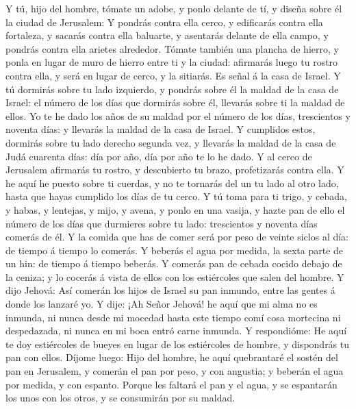  Y tú, hijo del hombre, tómate un adobe, y ponlo delante de
tí, y diseña sobre él la ciudad de Jerusalem:  Y pondrás
contra ella cerco, y edificarás contra ella fortaleza, y sacarás contra
ella baluarte, y asentarás delante de ella campo, y pondrás contra ella
arietes alrededor.  Tómate también una plancha de hierro, y
ponla en lugar de muro de hierro entre ti y la ciudad: afirmarás luego
tu rostro contra ella, y será en lugar de cerco, y la sitiarás. Es señal
á la casa de Israel.  Y tú dormirás sobre tu lado izquierdo,
y pondrás sobre él la maldad de la casa de Israel: el número de los días
que dormirás sobre él, llevarás sobre ti la maldad de ellos.
 Yo te he dado los años de su maldad por el número de los
días, trescientos y noventa días: y llevarás la maldad de la casa de
Israel.  Y cumplidos estos, dormirás sobre tu lado derecho
segunda vez, y llevarás la maldad de la casa de Judá cuarenta días: día
por año, día por año te lo he dado.  Y al cerco de Jerusalem
afirmarás tu rostro, y descubierto tu brazo, profetizarás contra ella.
 Y he aquí he puesto sobre ti cuerdas, y no te tornarás del
un tu lado al otro lado, hasta que hayas cumplido los días de tu cerco.
 Y tú toma para ti trigo, y cebada, y habas, y lentejas, y
mijo, y avena, y ponlo en una vasija, y hazte pan de ello el número de
los días que durmieres sobre tu lado: trescientos y noventa días comerás
de él.  Y la comida que has de comer será por peso de
veinte siclos al día: de tiempo á tiempo lo comerás.  Y
beberás el agua por medida, la sexta parte de un hin: de tiempo á tiempo
beberás.  Y comerás pan de cebada cocido debajo de la
ceniza; y lo cocerás á vista de ellos con los estiércoles que salen del
hombre.  Y dijo Jehová: Así comerán los hijos de Israel su
pan inmundo, entre las gentes á donde los lanzaré yo.  Y
dije: ¡Ah Señor Jehová! he aquí que mi alma no es inmunda, ni nunca
desde mi mocedad hasta este tiempo comí cosa mortecina ni despedazada,
ni nunca en mi boca entró carne inmunda.  Y respondióme: He
aquí te doy estiércoles de bueyes en lugar de los estiércoles de hombre,
y dispondrás tu pan con ellos.  Díjome luego: Hijo del
hombre, he aquí quebrantaré el sostén del pan en Jerusalem, y comerán el
pan por peso, y con angustia; y beberán el agua por medida, y con
espanto.  Porque les faltará el pan y el agua, y se
espantarán los unos con los otros, y se consumirán por su maldad.

